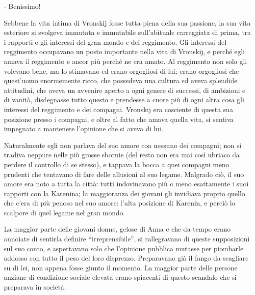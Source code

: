 - Benissimo! 

\label{xviii-1} 

Sebbene la vita intima di Vronskij fosse tutta piena della sua passione, la sua vita esteriore si svolgeva immutata e immutabile sull'abituale carreggiata di prima, tra i rapporti e gli interessi del gran mondo e del reggimento. Gli interessi del reggimento occupavano un posto importante nella vita di Vronskij, e perché egli amava il reggimento e ancor più perché ne era amato. Al reggimento non solo gli volevano bene, ma lo stimavano ed erano orgogliosi di lui; erano orgogliosi che quest'uomo enormemente ricco, che possedeva una cultura ed aveva splendide attitudini, che aveva un avvenire aperto a ogni genere di successi, di ambizioni e di vanità, disdegnasse tutto questo e prendesse a cuore più di ogni altra cosa gli interessi del reggimento e dei compagni. Vronskij era cosciente di questa sua posizione presso i compagni, e oltre al fatto che amava quella vita, si sentiva impegnato a mantenere l'opinione che si aveva di lui. 

Naturalmente egli non parlava del suo amore con nessuno dei compagni; non si tradiva neppure nelle più grosse sbornie (del resto non era mai così ubriaco da perdere il controllo di se stesso), e tappava la bocca a quei compagni meno prudenti che tentavano di fare delle allusioni al suo legame. Malgrado ciò, il suo amore era noto a tutta la città: tutti indovinavano più o meno esattamente i suoi rapporti con la Karenina; la maggioranza dei giovani gli invidiava proprio quello che c'era di più penoso nel suo amore: l'alta posizione di Karenin, e perciò lo scalpore di quel legame nel gran mondo. 

La maggior parte delle giovani donne, gelose di Anna e che da tempo erano annoiate di sentirla definire ``irreprensibile'', si rallegravano di queste supposizioni sul suo conto, e aspettavano solo che l'opinione pubblica mutasse per piombarle addosso con tutto il peso del loro disprezzo. Preparavano già il fango da scagliare su di lei, non appena fosse giunto il momento. La maggior parte delle persone anziane di condizione sociale elevata erano spiacenti di questo scandalo che si preparava in società. 

